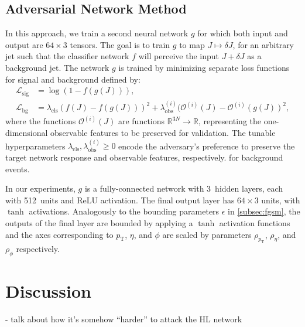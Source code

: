 \documentclass[reprint,nofootinbib,...]{revtex4-1}
\newcommand{\nconst}{64}       %
\newcommand{\nlayerADV}{3}
\newcommand{\nunitsADV}{512}
\newcommand{\pt}{p_\mathrm{T}} %
\begin{document}
\subsection{Adversarial Network Method}
In this approach, we train a second neural network $g$ for which both input and output are $\nconst\times 3$ tensors.
The goal is to train $g$ to map $J\mapsto\delta J$, for an arbitrary jet such that the classifier network $f$ will perceive the input $J+\delta J$ as a background jet.
The network $g$ is trained by minimizing separate loss functions for signal and background defined by:
\begin{align}
\mathcal{L}_\text{sig}&=\log(1-f(g(J))),\\
\mathcal{L}_\text{bg}&=\lambda_\mathrm{cls} (f(J)-f(g(J)))^2+ \lambda^{(i)}_\mathrm{obs} (\mathcal{O}^{(i)}(J)-\mathcal{O}^{(i)}(g(J))^2,
\end{align}
where the functions $\mathcal{O}^{(i)}(J)$ are functions $\mathbb{R}^{3N}\rightarrow \mathbb{R}$, representing the one-dimensional observable features to be preserved for validation.
The tunable hyperparameters $\lambda_\mathrm{cls}, \lambda^{(i)}_\mathrm{obs} \geq 0$ encode the adversary's preference to preserve the target network response and observable features, respectively. for background events.

In our experiments, $g$ is a fully-connected network with \nlayerADV\ hidden layers, each with \nunitsADV\ units and ReLU activation.
The final output layer has $\nconst\times 3$ units, with $\tanh$ activations.
Analogously to the bounding parameters $\epsilon$ in \ref{subsec:fgsm}, the outputs of the final layer are bounded by applying a $\tanh$ activation functions and the axes corresponding to $\pt$, $\eta$, and $\phi$ are scaled by parameters $\rho_{\pt}$, $\rho_\eta$, and $\rho_\phi$ respectively.


\section{Discussion}

- talk about how it's somehow ``harder'' to attack the HL network
\end{document}
